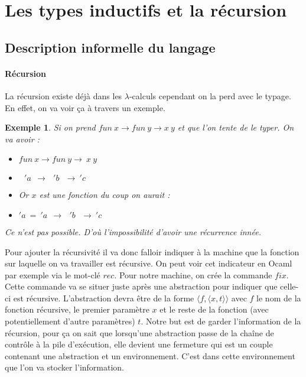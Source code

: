 \documentclass[10pt,a4paper]{report}
\newtheorem{ex}{Exemple}
\begin{document}
	\section{Les types inductifs et la récursion}
	
	\subsection{Description informelle du langage}
	
	\paragraph{Récursion } La récursion existe déjà dans les $\lambda$-calculs cependant on la perd avec le typage. En effet, on va voir ça à travers un exemple.
	
	\begin{ex}
		Si on prend $fun~x \rightarrow fun~y \rightarrow x~y$ et que l'on tente de le typer. On va avoir :
		\smallbreak
		\begin{itemize}
			\item[-] $fun~x \rightarrow fun~y \rightarrow~x~y$
			\item[-] $~~~'a~~\rightarrow ~~~'b~~~\rightarrow~'c$
			\item[] Or $x$ est une fonction du coup on aurait :
			\item[-] $'a~=~'a~~\rightarrow ~~~'b~~~\rightarrow~'c$
		\end{itemize} 
		Ce n'est pas possible. D'où l'impossibilité d'avoir une récurrence innée. 
	\end{ex}

	Pour ajouter la récursivité il va donc falloir indiquer à la machine que la fonction sur laquelle on va travailler est récursive. On peut voir cet indicateur en Ocaml par exemple via le mot-clé $rec$. Pour notre machine, on crée la commande $fix$. Cette commande va se situer juste après une abstraction pour indiquer que celle-ci est récursive. L'abstraction devra être de la forme $\langle f,\langle x,t\rangle\rangle$ avec $f$ le nom de la fonction récursive, le premier paramètre $x$ et le reste de la fonction (avec potentiellement d'autre paramètres) $t$. Notre but est de garder l'information de la récursion, pour ça on sait que lorsqu'une abstraction passe de la chaîne de contrôle à la pile d'exécution, elle devient une fermeture qui est un couple contenant une abstraction et un environnement. C'est dans cette environnement que l'on va stocker l'information.
	
\end{document}
